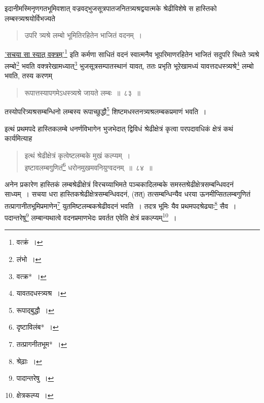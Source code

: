 \documentclass[10pt, openany]{book}
\begin{document}
{{इदानीमस्मिनृणगतभूमिवशात् वज्रवद्भुजसूत्रपातजनितत्र्यश्रद्वयात्मके
श्रेढीविशेषे स}
{हास्तिको लम्बस्त्र्यश्रयोर्विभज्यते\textemdash}

\begin{quote}

{\bs उपरि त्र्यश्रे लम्बो भूमितिरहितेन भाजितं वदनम्~।}\end{quote}

{\hyperref[81]{'सचया सा स्यात् वक्त्रम्'}\renewcommand{\thefootnote}{\s ११}\footnote{\s वत्क्रं~।} इति कर्मणा साधितं वदनं स्वात्मनैव
भूपरिमाणरहितेन}
{भाजितं सदुपरि स्थिते त्र्यश्रे लम्बो\renewcommand{\thefootnote}{\s १२}\footnote{\s लंभो~।} भवति वक्त्ररेखामध्यात्\renewcommand{\thefootnote}{\s १३}\footnote{\s वत्क्र*~।}
भुजसूत्रसम्पातस्थानं यावत्,}
{ततः प्रभृति भूरेखामध्यं यावत्तदधस्त्र्यश्रे\renewcommand{\thefootnote}{\s १४}\footnote{\s यावतदधस्त्र्यश्र~।} लम्बो भवति, तस्य
करणम्\textemdash}

\begin{quote}

{\bs रूपात्तस्यापगमेऽधस्त्र्यश्रे जायते लम्बः~॥~८३~॥}\end{quote}

{तस्योपरित्र्यश्रसम्बन्धिनो लम्बस्य रूपाच्छुद्धौ\renewcommand{\thefootnote}{\s १५}\footnote{\s रूपाद्बुद्धौ~।}
शिष्टमधस्तनत्र्यश्रलम्बकप्रमाणं भवति~।}
\vspace{3mm}

{इत्थं प्रथमपदे हास्तिकलम्बे धनर्णविभागेन भुजभेदात् द्विविधं
श्रेढीक्षेत्रं कृत्वा परपदावधिकं क्षेत्रं कथं कार्यमित्याह\textemdash}
    
\begin{quote}

{\bs इत्थं श्रेढीक्षेत्रं कृत्वेष्टलम्बके मुखं कल्प्यम्~। \\
इष्टावलम्बगुणितं\renewcommand{\thefootnote}{\s १६}\footnote{\s दृष्टाविलंब*~।} धरोनमुखमवनियुग्वदनम्~॥~८४~॥}\end{quote}

{अनेन प्रकारेण हास्तिकं लम्बश्रेढीक्षेत्रं विरचय्याभिमते पञ्चकादिलम्बके
समस्तश्रेढीक्षेत्रसम्बन्धिवदनं साध्यम्~। सचया धरा
हास्तिकश्रेढीक्षेत्रसम्बन्धिवदनं, (तत्) तत्सम्बन्धिन्यैव}
{धरया ऊनमीप्सितलम्बगुणितं तत्प्रागानीतभूमिप्रमाणेन\renewcommand{\thefootnote}{\s १७}\footnote{\s तत्प्रागनीतभूम*~।}
युतमिष्टलम्बकश्रेढीवदनं भवति~।}
{तदत्र भूमिः यैव प्रथमपदश्रेढ्याः\renewcommand{\thefootnote}{\s १८}\footnote{\s *श्रेढ़ाः~।}  सैव~। पदान्तरेषु\renewcommand{\thefootnote}{\s १९}\footnote{\s पादान्तरेषु~।}
लम्बान्यथात्वे वदनप्रमाणभेदः प्रवर्तत एवेति}
{क्षेत्रं प्रकल्प्यम्\renewcommand{\thefootnote}{\s २०}\footnote{\s क्षेत्रकल्प्य~।}~।}
\vspace{2mm}



}
\end{document}
